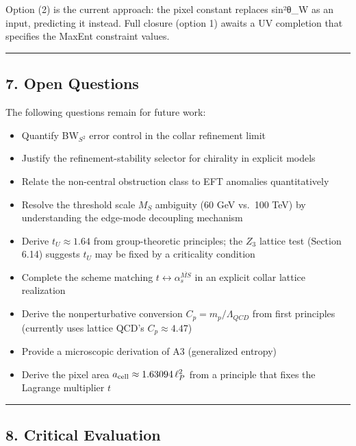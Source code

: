 \documentclass[11pt,a4paper]{article}
\theoremstyle{remark}
\providecommand{\tightlist}{%
  \setlength{\itemsep}{0pt}\setlength{\parskip}{0pt}}
\begin{document}
Option (2) is the current approach: the pixel constant replaces sin²θ\_W as an input, predicting it instead. Full closure (option 1) awaits a UV completion that specifies the MaxEnt constraint values.

\begin{center}\rule{0.5\linewidth}{0.5pt}\end{center}

\subsection{7. Open Questions}\label{open-questions}

The following questions remain for future work:

\begin{itemize}
\tightlist
\item
  Quantify BW\(_{S^2}\) error control in the collar refinement limit
\item
  Justify the refinement-stability selector for chirality in explicit models
\item
  Relate the non-central obstruction class to EFT anomalies quantitatively
\item
  Resolve the threshold scale \(M_S\) ambiguity (60 GeV vs.~100 TeV) by understanding the edge-mode decoupling mechanism
\item
  Derive \(t_U \approx 1.64\) from group-theoretic principles; the \(Z_3\) lattice test (Section 6.14) suggests \(t_U\) may be fixed by a criticality condition
\item
  Complete the scheme matching \(t \leftrightarrow \alpha_s^{\overline{MS}}\) in an explicit collar lattice realization
\item
  Derive the nonperturbative conversion \(C_p = m_p/\Lambda_{QCD}\) from first principles (currently uses lattice QCD's \(C_p \approx 4.47\))
\item
  Provide a microscopic derivation of A3 (generalized entropy)
\item
  Derive the pixel area \(a_{\rm cell} \approx 1.63094\,\ell_P^2\) from a principle that fixes the Lagrange multiplier \(t\)
\end{itemize}

\begin{center}\rule{0.5\linewidth}{0.5pt}\end{center}

\subsection{8. Critical Evaluation}\label{critical-evaluation}
\end{document}

